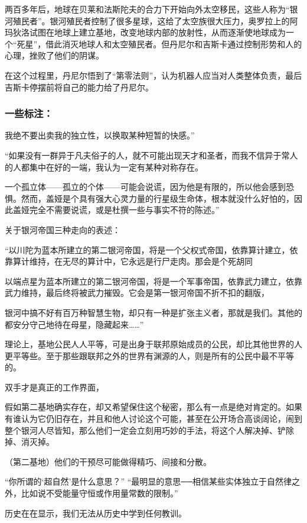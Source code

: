 两百多年后，地球在贝莱和法斯陀夫的合力下开始向外太空移民，这些人称为“银河殖民者”。银河殖民者控制了很多星球，这给了太空族很大压力，奥罗拉上的阿玛狄洛试图在地球上建立基地，改变地球内部的放射性，从而逐渐使地球成为一个“死星”，借此消灭地球人和太空殖民者。但丹尼尔和吉斯卡通过控制形势和人的心理，挫败了他们的阴谋。

在这个过程里，丹尼尔悟到了“第零法则”，认为机器人应当对人类整体负责，最后吉斯卡停摆前将自己的能力给了丹尼尔。

\subsubsection{一些标注：}
我绝不要出卖我的独立性，以换取某种短暂的快感。”

“如果没有一群异于凡夫俗子的人，就不可能出现天才和圣者，而我不信异于常人的人都集中在好的一端，我认为一定有某种对称存在。

一个孤立体——孤立的个体——可能会说谎，因为他是有限的，所以他会感到恐惧。然而，盖娅是个具有强大心灵力量的行星级生命体，根本就没什么好怕的，因此盖娅完全不需要说谎，或是杜撰一些与事实不符的陈述。”

关于银河帝国三种走向的表述：
\begin{itemize*}
	\item “以川陀为蓝本所建立的第二银河帝国，将是一个父权式帝国，依靠算计建立，依靠算计维持，在无尽的算计中，它永远是行尸走肉。那会是个死胡同
	\item 以端点星为蓝本所建立的第二银河帝国，将是一个军事帝国，依靠武力建立，依靠武力维持，最后终将被武力摧毁。它会是第一银河帝国不折不扣的翻版，
\end{itemize*}
银河中搞不好有百万种智慧生物，却只有一种是扩张主义者，那就是我们。其他的都安分守己地待在母星，隐藏起来……”

理论上，基地公民人人平等，可是出身于联邦原始成员的公民，却比其他世界的人更平等些。至于那些跟联邦之外的世界有渊源的人，则是所有的公民中最不平等的。

双手才是真正的工作界面，

假如第二基地确实存在，却又希望保住这个秘密，那么有一点是绝对肯定的。如果有谁认为它仍旧存在，并且和他人讨论这个可能，甚至在公开场合高谈阔论，闹到整个银河人尽皆知，那么他们一定会立刻用巧妙的手法，将这个人解决掉、铲除掉、消灭掉。

（第二基地）他们的干预尽可能做得精巧、间接和分散。

“你所谓的‘超自然’是什么意思？” “最明显的意思──相信某些实体独立于自然律之外，比如说不受能量守恒或作用量常数的限制。”

历史在在显示，我们无法从历史中学到任何教训。

